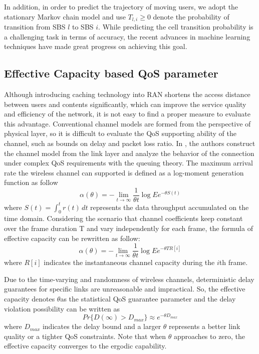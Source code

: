 \documentclass[conference]{IEEEtran}
\begin{document}
In addition, in order to predict the trajectory of moving users, we adopt the stationary Markov chain model and use $T_{l,i}\ge 0$ denote the probability of transition from SBS $l$ to SBS $i$. While predicting the cell transition probability is a challenging task in terms of accuracy, the recent advances in machine learning techniques have made great progress on achieving this goal.

\subsection{Effective Capacity based QoS parameter}
Although introducing caching technology into RAN shortens the access distance between users and contents significantly, which can improve the service quality and efficiency of the network, it is not easy to find a proper measure to evaluate this advantage. Conventional channel models are formed from the perspective of physical layer, so it is difficult to evaluate the QoS supporting ability of the channel, such as bounds on delay and packet loss ratio. In \cite{1210731}, the authors construct the channel model from the link layer and analyze the behavior of the connection under complex QoS requirements with the queuing theory. The maximum arrival rate the wireless channel can supported is defined as a log-moment generation function as follow
\begin{equation}
\alpha(\theta)=-\lim_{t \to \infty}\frac{1}{\theta t}\log E{e^{-\theta S(t)}}
\end{equation}
where $S(t)=\int_{0}^{t} r(t)\, dt$ represents the data throughput accumulated on the time domain. Considering the scenario that channel coefficients keep constant over the frame duration T and vary independently for each frame, the formula of effective capacity can be rewritten as follow:
\begin{equation}
\alpha(\theta)=-\lim_{t \to \infty}\frac{1}{\theta t}\log E{e^{-\theta TR[i]}}
\end{equation}
where $R[i]$ indicates the instantaneous channel capacity during the $i$th frame.

Due to the time-varying and randomness of wireless channels, deterministic delay guarantees for specific links are unreasonable and impractical. So, the effective capacity denotes
$\theta$as the statistical QoS guarantee parameter and the delay violation possibility can be written as
\begin{equation}
Pr\{D(\infty)>D_{max}\}\approx e^{-\theta D_{max}}
\end{equation}
where $D_{max}$ indicates the delay bound and a larger $\theta$ represents a better link quality or a tighter QoS constraints. Note that when $\theta$ approaches to zero, the effective capacity converges to the ergodic capability.
\end{document}
